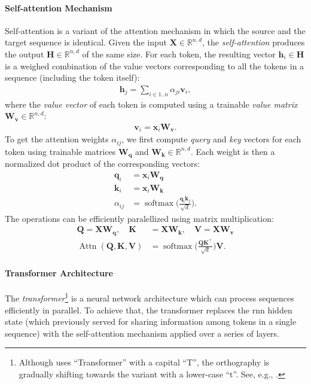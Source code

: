 {\paragraph{Self-attention Mechanism} Self-attention \cite{cheng2016long,vaswani2017attention} is a variant of the attention mechanism in which the source and the target sequence is identical. Given the input $\mathbf{X} \in \mathbb{R}^{n,d}$, the \emph{self-attention} produces the output $\mathbf{H} \in \mathbb{R}^{n,d}$ of the same size. For each token, the resulting vector $\mathbf{h}_i \in \mathbf{H}$ is a weighed combination of the value vectors corresponding to all the tokens in a sequence (including the token itself):
\begin{align}
  \mathbf{h}_j = \sum_{i\in 1..n} \alpha_{ji} \mathbf{v}_i,
\end{align}
where the \emph{value vector} of each token is computed using a trainable \emph{value matrix} $\mathbf{W_v} \in \mathbb{R}^{n,d}$:
\begin{align}
  \mathbf{v}_i = \mathbf{x}_i \mathbf{W_v}.
\end{align}
To get the attention weights $\alpha_{ij}$, we first compute \textit{query} and \textit{key} vectors for each token using trainable matrices $\mathbf{W_q}$ and $\mathbf{W_k} \in \mathbb{R}^{n,d}$. Each weight is then a normalized dot product of the corresponding vectors:
\begin{align}
  \mathbf{q}_i & = \mathbf{x}_i \mathbf{W_q}                                                      \\
  \mathbf{k}_i & = \mathbf{x}_i \mathbf{W_k}                                                      \\
  \alpha_{ij}  & = \operatorname{softmax}\biggl(\frac{\mathbf{q}_i\mathbf{k}_j}{\sqrt{d}}\biggr).
\end{align}
The operations can be efficiently paralellized using matrix multiplication:
\begin{align}
  \mathbf{Q}                                             = \mathbf{X}\mathbf{W_q},\quad\mathbf{K} & = \mathbf{X}\mathbf{W_k},\quad\mathbf{V} = \mathbf{X}\mathbf{W_v}                           \\
  \operatorname{Attn}(\mathbf{Q}, \mathbf{K}, \mathbf{V})                                         & = \operatorname{softmax}\biggl(\frac{\mathbf{Q}\mathbf{K}^\top}{\sqrt{d}}\biggr)\mathbf{V}.
\end{align}


\paragraph{Transformer Architecture} The \emph{transformer}\footnote{Although \citet{vaswani2017attention} uses ``Transformer'' with a capital ``T'', the orthography is gradually shifting towards the variant with a lower-case ``t''. See, e.g., \citet[p.~215]{jurafsky2024}.} \cite{vaswani2017attention} is a neural network architecture which can process sequences efficiently in parallel. To achieve that, the transformer replaces the \ac{rnn} hidden state (which previously served for sharing information among tokens in a single sequence) with the self-attention mechanism applied over a series of layers.

}
